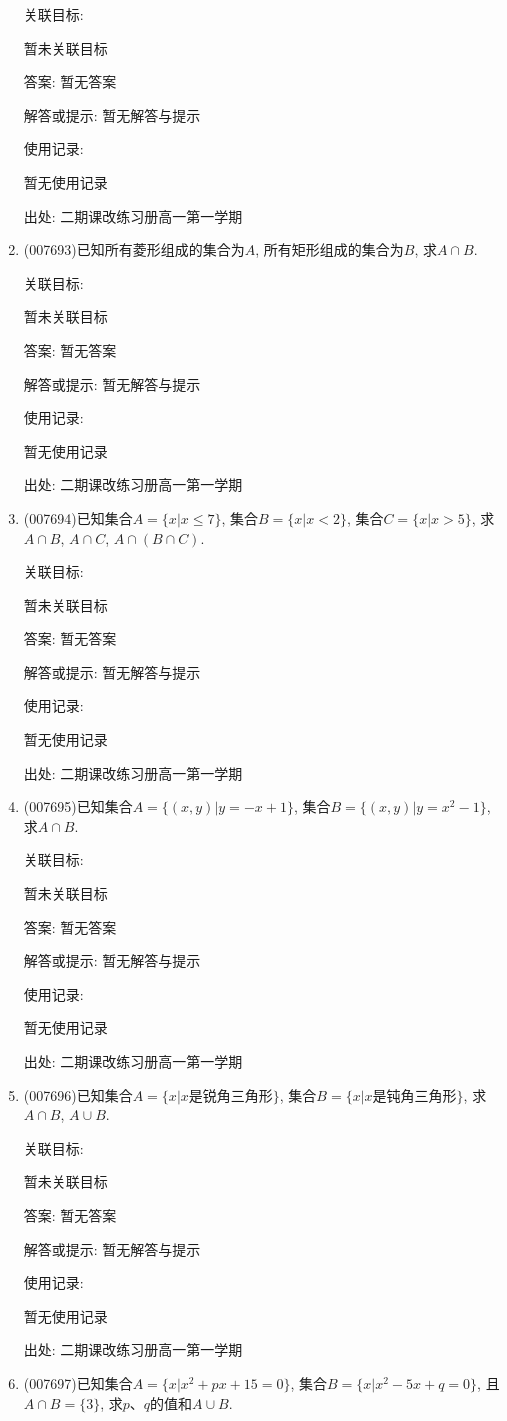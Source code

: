 \documentclass[10pt,a4paper]{article}
\begin{document}
\begin{enumerate}[1.]
关联目标:

暂未关联目标

答案: 暂无答案

解答或提示: 暂无解答与提示

使用记录:

暂无使用记录


出处: 二期课改练习册高一第一学期
\item { (007693)}已知所有菱形组成的集合为$A$, 所有矩形组成的集合为$B$, 求$A\cap B$.


关联目标:

暂未关联目标

答案: 暂无答案

解答或提示: 暂无解答与提示

使用记录:

暂无使用记录


出处: 二期课改练习册高一第一学期
\item { (007694)}已知集合$A=\{x|x\le 7\}$, 集合$B=\{x|x<2\}$, 集合$C=\{x|x>5\}$, 求$A\cap B$, $A\cap C$, $A\cap (B\cap C)$.


关联目标:

暂未关联目标

答案: 暂无答案

解答或提示: 暂无解答与提示

使用记录:

暂无使用记录


出处: 二期课改练习册高一第一学期
\item { (007695)}已知集合$A=\{(x,y)|y=-x+1\}$, 集合$B=\{(x,y)|y=x^2-1\}$, 求$A\cap B$.


关联目标:

暂未关联目标

答案: 暂无答案

解答或提示: 暂无解答与提示

使用记录:

暂无使用记录


出处: 二期课改练习册高一第一学期
\item { (007696)}已知集合$A=\{x|x\text{是锐角三角形}\}$, 集合$B=\{x|x\text{是钝角三角形}\}$, 求$A\cap B$, $A\cup B$.


关联目标:

暂未关联目标

答案: 暂无答案

解答或提示: 暂无解答与提示

使用记录:

暂无使用记录


出处: 二期课改练习册高一第一学期
\item { (007697)}已知集合$A=\{x|x^2+px+15=0\}$, 集合$B=\{x|x^2-5x+q=0\}$, 且$A\cap B=\{3\}$, 求$p$、$q$的值和$A\cup B$.



\end{enumerate}
\end{document}
